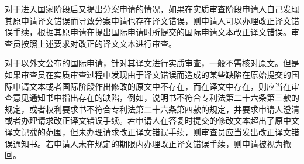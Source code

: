 对于进入国家阶段后又提出分案申请的情况，如果在实质审查阶段申请人自己发现其原申请译文错误而导致分案申请也存在译文错误，则申请人可以办理改正译文错误手续，根据其原申请在提出国际申请时所提交的国际申请文本改正译文错误。审查员按照上述要求对改正的译文文本进行审查。

对于以外文公布的国际申请，针对其译文进行实质审查，一般不需核对原文。但是如果审查员在实质审查过程中发现由于译文错误而造成的某些缺陷在原始提交的国际申请文本或者国际阶段作出修改的原文中不存在，而在译文中存在，则应当在审查意见通知书中指出存在的缺陷，例如，说明书不符合专利法第二十六条第三款的规定，或者权利要求书不符合专利法第二十六条第四款的规定，并要求申请人澄清或者办理请求改正译文错误手续。若申请人在答复时提交的修改文本超出了原中文译文记载的范围，但未办理请求改正译文错误手续，则审查员应当发出改正译文错误通知书。若申请人未在规定的期限内办理改正译文错误手续，则申请被视为撤回。

\stopparttoc
